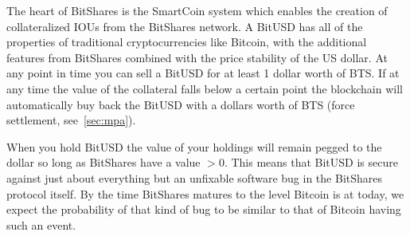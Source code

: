 The heart of BitShares is the SmartCoin system which enables the creation of
collateralized IOUs from the BitShares network. A BitUSD has all of the
properties of traditional cryptocurrencies like Bitcoin, with the additional
features from BitShares combined with the price stability of the US dollar. At
any point in time you can sell a BitUSD for at least 1 dollar worth of BTS. If
at any time the value of the collateral falls below a certain point the
blockchain will automatically buy back the BitUSD with a dollars worth of BTS
(force settlement, see~\cref{sec:mpa}).

When you hold BitUSD the value of your holdings will remain pegged to the
dollar so long as BitShares have a value $>0$. This means that BitUSD is secure
against just about everything but an unfixable software bug in the BitShares
protocol itself. By the time BitShares matures to the level Bitcoin is at
today, we expect the probability of that kind of bug to be similar to that of
Bitcoin having such an event.
